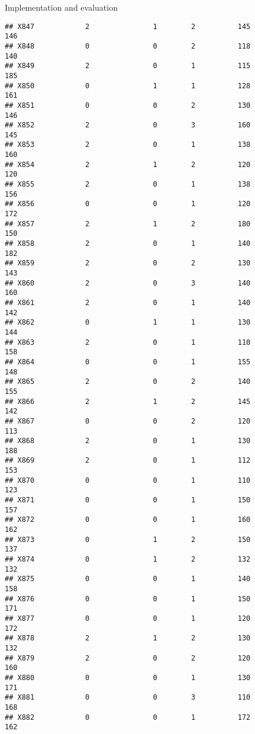 \documentclass[
  ignorenonframetext,
]{beamer}
\begin{document}
\begin{frame}[fragile]{Implementation and evaluation}
\begin{verbatim}
## X847            2               1        2          145            146
## X848            0               0        2          118            140
## X849            2               0        1          115            185
## X850            0               1        1          128            161
## X851            0               0        2          130            146
## X852            2               0        3          160            145
## X853            2               0        1          138            160
## X854            2               1        2          120            120
## X855            2               0        1          138            156
## X856            0               0        1          120            172
## X857            2               1        2          180            150
## X858            2               0        1          140            182
## X859            2               0        2          130            143
## X860            2               0        3          140            160
## X861            2               0        1          140            142
## X862            0               1        1          130            144
## X863            2               0        1          110            158
## X864            0               0        1          155            148
## X865            2               0        2          140            155
## X866            2               1        2          145            142
## X867            0               0        2          120            113
## X868            2               0        1          130            188
## X869            2               0        1          112            153
## X870            0               0        1          110            123
## X871            0               0        1          150            157
## X872            0               0        1          160            162
## X873            0               1        2          150            137
## X874            0               1        2          132            132
## X875            0               0        1          140            158
## X876            0               0        1          150            171
## X877            0               0        1          120            172
## X878            2               1        2          130            132
## X879            2               0        2          120            160
## X880            0               0        1          130            171
## X881            0               0        3          110            168
## X882            0               0        1          172            162

\end{verbatim}
\end{frame}
\end{document}
